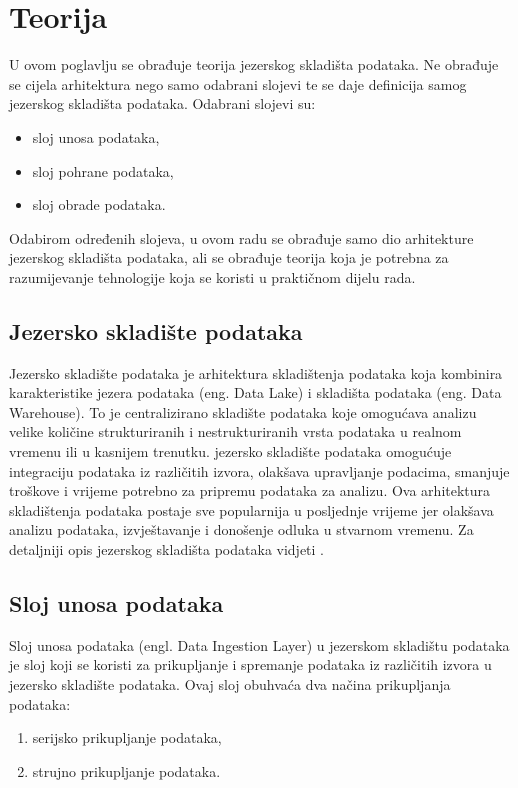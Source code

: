 \chapter{Teorija} \label{chapter:teorija} 

U ovom poglavlju se obrađuje teorija jezerskog skladišta podataka. Ne obrađuje
se cijela arhitektura nego samo odabrani slojevi te se daje definicija samog
jezerskog skladišta podataka. Odabrani slojevi su:
\begin{itemize}
    \item sloj unosa podataka,
    \item sloj pohrane podataka,
    \item sloj obrade podataka.
\end{itemize}
Odabirom određenih slojeva, u ovom radu se obrađuje samo dio arhitekture
jezerskog skladišta podataka, ali se obrađuje teorija koja je potrebna za
razumijevanje tehnologije koja se koristi u praktičnom dijelu rada. 

\section{Jezersko skladište podataka} \label{section:jezersko_skladiste_podataka}

Jezersko skladište podataka je arhitektura skladištenja
podataka koja kombinira karakteristike jezera podataka (eng. Data Lake) i
skladišta podataka (eng. Data Warehouse). To je centralizirano skladište
podataka koje omogućava analizu velike količine strukturiranih i
nestrukturiranih vrsta podataka u realnom vremenu ili u kasnijem trenutku.
jezersko skladište podataka omogućuje integraciju podataka iz različitih izvora,
olakšava upravljanje podacima, smanjuje troškove i vrijeme potrebno za pripremu
podataka za analizu. Ova arhitektura skladištenja podataka postaje sve
popularnija u posljednje vrijeme jer olakšava analizu podataka, izvještavanje i
donošenje odluka u stvarnom vremenu. Za detaljniji opis jezerskog skladišta
podataka vidjeti \cite{datalakehouse2022}.

\section{Sloj unosa podataka} \label{section:sloj_unosa_podataka}

Sloj unosa podataka (engl. Data Ingestion Layer) u jezerskom skladištu podataka
je sloj koji se koristi za prikupljanje i spremanje podataka iz različitih
izvora u jezersko skladište podataka. Ovaj sloj obuhvaća dva načina prikupljanja
podataka:
\begin{enumerate}
    \item serijsko prikupljanje podataka,
    \item strujno prikupljanje podataka.
\end{enumerate}

